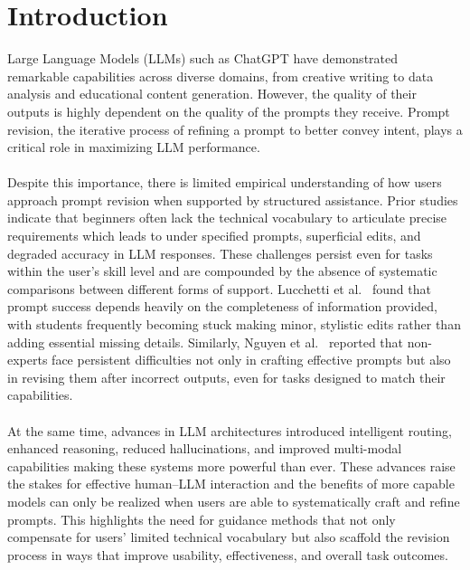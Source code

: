 \section{\textbf{Introduction}}

Large Language Models (LLMs) such as ChatGPT have demonstrated remarkable capabilities across diverse domains, from creative writing to data analysis and educational content generation. However, the quality of their outputs is highly dependent on the quality of the prompts they receive. Prompt revision, the iterative process of refining a prompt to better convey intent, plays a critical role in maximizing LLM performance.
\paragraph{}
Despite this importance, there is limited empirical understanding of how users approach prompt revision when supported by structured assistance. Prior studies indicate that beginners often lack the technical vocabulary to articulate precise requirements which leads to under specified prompts, superficial edits, and degraded accuracy in LLM responses. These challenges persist even for tasks within the user's skill level and are compounded by the absence of systematic comparisons between different forms of support. Lucchetti et al.~\cite{Lucchetti2025Substance} found that prompt success depends heavily on the completeness of information provided, with students frequently becoming stuck making minor, stylistic edits rather than adding essential missing details. Similarly, Nguyen et al.~\cite{Nguyen2024Beginning} reported that non-experts face persistent difficulties not only in crafting effective prompts but also in revising them after incorrect outputs, even for tasks designed to match their capabilities.
\paragraph{}
At the same time, advances in LLM architectures introduced intelligent routing, enhanced reasoning, reduced hallucinations, and improved multi-modal capabilities making these systems more powerful than ever. These advances raise the stakes for effective human--LLM interaction and the benefits of more capable models can only be realized when users are able to systematically craft and refine prompts. This highlights the need for guidance methods that not only compensate for users' limited technical vocabulary but also scaffold the revision process in ways that improve usability, effectiveness, and overall task outcomes.
